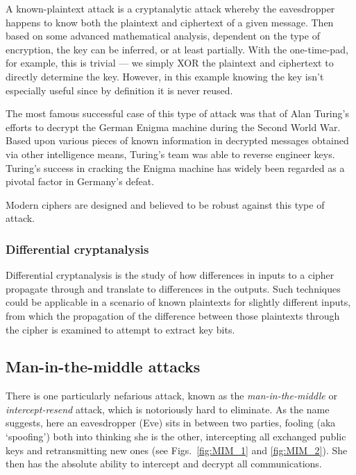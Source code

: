 A known-plaintext attack is a cryptanalytic attack whereby the eavesdropper happens to know both the plaintext and ciphertext of a given message. Then based on some advanced mathematical analysis, dependent on the type of encryption, the key can be inferred, or at least partially. With the one-time-pad, for example, this is trivial --- we simply XOR the plaintext and ciphertext to directly determine the key. However, in this example knowing the key isn't especially useful since by definition it is never reused.

The most famous successful case of this type of attack was that of Alan Turing's efforts to decrypt the German Enigma machine during the Second World War. Based upon various pieces of known information in decrypted messages obtained via other intelligence means, Turing's team was able to reverse engineer keys. Turing's success in cracking the Enigma machine has widely been regarded as a pivotal factor in Germany's defeat.

Modern ciphers are designed and believed to be robust against this type of attack.

\subsubsection{Differential
cryptanalysis} \label{differential-cryptanalysis}

Differential cryptanalysis is the study of how differences in inputs to a cipher propagate through and translate to differences in the outputs. Such techniques could be applicable in a scenario of known plaintexts for slightly different inputs, from which the propagation of the difference between those plaintexts through the cipher is examined to attempt to extract key bits.

\subsection{Man-in-the-middle attacks} \label{man-in-the-middle-attacks}

There is one particularly nefarious attack, known as the \emph{man-in-the-middle} or \emph{intercept-resend} attack, which is notoriously hard to eliminate. As the name suggests, here an eavesdropper (Eve) sits in between two parties, fooling (aka `spoofing') both into thinking she is the other, intercepting all exchanged public keys and retransmitting new ones (see Figs.~\ref{fig:MIM_1} and \ref{fig:MIM_2}). She then has the absolute ability to intercept and decrypt all communications.

